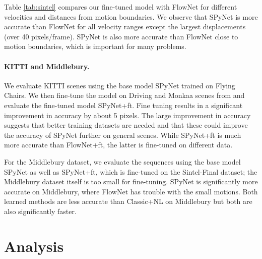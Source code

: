 \documentclass[10pt,twocolumn,letterpaper]{article}
\begin{document}
Table \ref{tab:sintel} compares our fine-tuned model with FlowNet \cite{dosovitskiy2015flownet} for different velocities and distances from motion boundaries. 
We observe that SPyNet is more accurate than FlowNet for all velocity ranges  except the largest displacements (over 40 pixels/frame). 
SPyNet is also more accurate than FlowNet close to motion boundaries, which is important for many problems.  %

\paragraph{KITTI and Middlebury.}
We evaluate KITTI \cite{Geiger2012CVPR} scenes using the base model SPyNet trained on Flying Chairs. 
We then fine-tune the model on Driving and Monkaa scenes from \cite{sceneflowdataset} and evaluate the fine-tuned model SPyNet+ft. 
Fine tuning results in a significant improvement in accuracy by about 5 pixels.
The large improvement in accuracy suggests that better training datasets are needed and that these could improve the accuracy of SPyNet further on general scenes.
 While SPyNet+ft is much more accurate than FlowNet+ft, the latter is fine-tuned on different data.

For the Middlebury \cite{baker2011database} dataset, we evaluate the sequences using the base model SPyNet
as well as SPyNet+ft,  which is fine-tuned on the  Sintel-Final dataset;  the Middlebury dataset itself is too small for fine-tuning. 
SPyNet is significantly more accurate on Middlebury, where FlowNet has trouble with the small motions.
Both learned methods are less accurate than Classic+NL on Middlebury but both are also significantly faster.



\section{Analysis}
\end{document}
